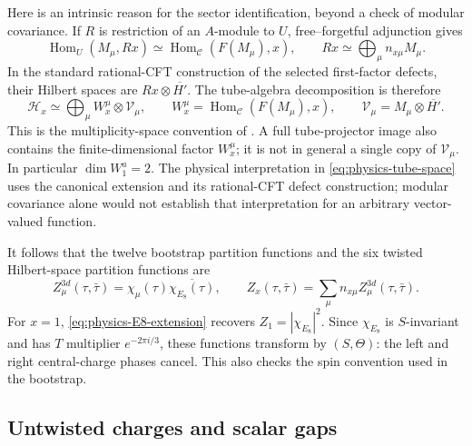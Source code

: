 \documentclass[11pt,a4paper]{article}
\theoremstyle{definition}
\begin{document}
Here is an intrinsic reason for the sector identification, beyond a
check of modular covariance. If $R$ is restriction of an $A$-module
to $U$, free--forgetful adjunction gives
\begin{equation}
 \operatorname{Hom}_{U}(M_\mu,Rx)
 \simeq\operatorname{Hom}_{\mathcal C}(F(M_\mu),x),
 \qquad
 Rx\simeq\bigoplus_\mu n_{x\mu}M_\mu.
 \label{eq:physics-adjunction}
\end{equation}
In the standard rational-CFT construction of the selected first-factor
defects, their Hilbert spaces are $Rx\otimes\overline{H'}$.
The tube-algebra decomposition is therefore
\begin{equation}
 \mathcal H_x
  \simeq\bigoplus_\mu W_x^\mu\otimes\mathcal V_\mu,
 \qquad
 W_x^\mu=\operatorname{Hom}_{\mathcal C}(F(M_\mu),x),
 \qquad
 \mathcal V_\mu=M_\mu\otimes\overline{H'}.
 \label{eq:physics-tube-space}
\end{equation}
This is the multiplicity-space convention of
\cite[Eq.~(4.1)]{LS}. A full tube-projector image also contains the
finite-dimensional factor $W_x^\mu$; it is not in general a single
copy of $\mathcal V_\mu$. In particular $\dim W_1^a=2$.
The physical interpretation in \eqref{eq:physics-tube-space} uses the
canonical extension and its rational-CFT defect construction; modular
covariance alone would not establish that interpretation for an
arbitrary vector-valued function.

It follows that the twelve bootstrap partition functions and the six
twisted Hilbert-space partition functions are
\begin{equation}
 Z_\mu^{3d}(\tau,\bar\tau)
   =\chi_\mu(\tau)\overline{\chi_{E_8}(\tau)},
 \qquad
 Z_x(\tau,\bar\tau)=\sum_\mu n_{x\mu}Z_\mu^{3d}(\tau,\bar\tau).
 \label{eq:physics-H3-sector-functions}
\end{equation}
For $x=1$, \eqref{eq:physics-E8-extension} recovers
$Z_1=|\chi_{E_8}|^2$. Since $\chi_{E_8}$ is $S$-invariant and has
$T$ multiplier $e^{-2\pi i/3}$, these functions transform by
$(S,\Theta)$: the left and right central-charge phases cancel.
This also checks the spin convention used in the bootstrap.

\subsection{Untwisted charges and scalar gaps}
\end{document}
